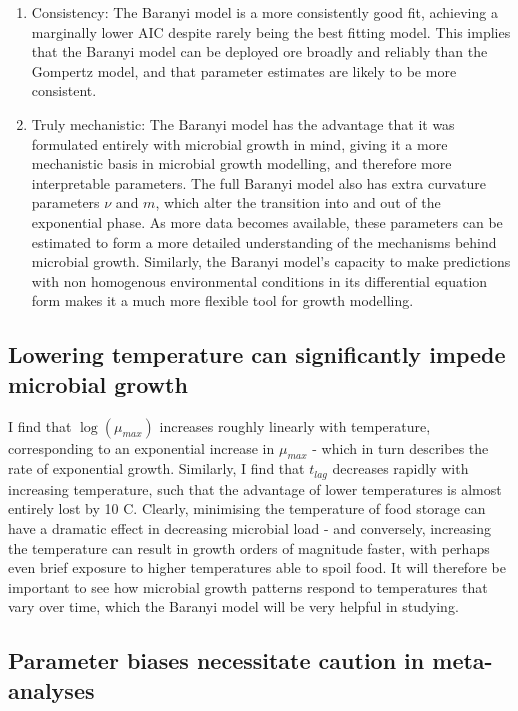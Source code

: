 \documentclass[11pt, a4paper]{article}
\begin{document}
\begin{linenumbers}
\begin{enumerate}
\item{Consistency: }
The Baranyi model is a more consistently good fit, achieving a marginally lower AIC despite rarely being the best fitting model. This implies that the Baranyi model can be deployed ore broadly and reliably than the Gompertz model, and that parameter estimates are likely to be more consistent.

\item{Truly mechanistic: }
The Baranyi model has the advantage that it was formulated entirely with microbial growth in mind, giving it a more mechanistic basis in microbial growth modelling, and therefore more interpretable parameters. The full Baranyi model also has extra curvature parameters $\nu$ and $m$, which alter the transition into and out of the exponential phase. As more data becomes available, these parameters can be estimated to form a more detailed understanding of the mechanisms behind microbial growth. Similarly, the Baranyi model's capacity to make predictions with non homogenous environmental conditions in its differential equation form makes it a much more flexible tool for growth modelling. 

 \end{enumerate}

\subsection{Lowering temperature can significantly impede microbial growth}

I find that $\log(\mu_{max})$ increases roughly linearly with temperature, corresponding to an exponential increase in $\mu_{max}$  - which in turn describes the rate of exponential growth. Similarly, I find that $t_{lag}$ decreases rapidly with increasing temperature, such that the advantage of lower temperatures is almost entirely lost by 10 \degree C. Clearly, minimising the temperature of food storage can have a dramatic effect in decreasing microbial load - and conversely, increasing the temperature can result in growth orders of magnitude faster, with perhaps even brief exposure to higher temperatures able to spoil food. It will therefore be important to see how microbial growth patterns respond to temperatures that vary over time, which the Baranyi model will be very helpful in studying.

\subsection{Parameter biases necessitate caution in meta-analyses}


\end{linenumbers}
\end{document}
